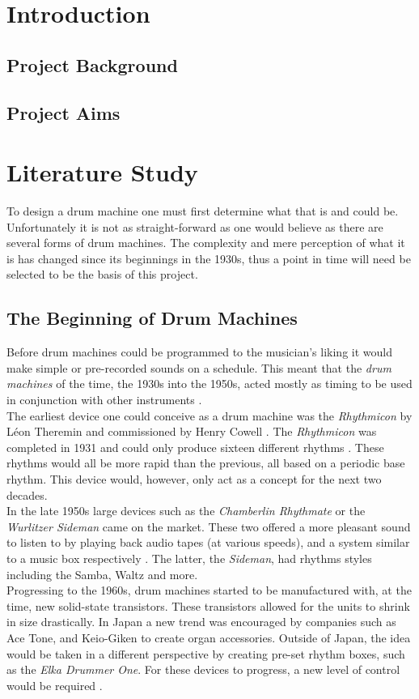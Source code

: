 \documentclass[12pt,a4paper]{report}
\begin{document}
\chapter{Introduction}
\section{Project Background}
\section{Project Aims}

\chapter{Literature Study}
To design a drum machine one must first determine what that is and could be. Unfortunately it is not as straight-forward as one would believe as there are several forms of drum machines. The complexity and mere perception of what it is has changed since its beginnings in the 1930s, thus a point in time will need be selected to be the basis of this project.
\section{The Beginning of Drum Machines}
Before drum machines could be programmed to the musician's liking it would make simple or pre-recorded sounds on a schedule. This meant that the \textit{drum machines} of the time, the 1930s into the 1950s, acted mostly as timing to be used in conjunction with other instruments \cite{rhythmart}. \\
The earliest device one could conceive as a drum machine was the \textit{Rhythmicon} by L\'eon Theremin and commissioned by Henry Cowell \cite{rhythmart, beatgoeson}. The \textit{Rhythmicon} was completed in 1931 and could only produce sixteen different rhythms \cite{schedel}. These rhythms would all be more rapid than the previous, all based on a periodic base rhythm. This device would, however, only act as a concept for the next two decades. \\
In the late 1950s large devices such as the \textit{Chamberlin Rhythmate} or the \textit{Wurlitzer Sideman} came on the market. These two offered a more pleasant sound to listen to by playing back audio tapes (at various speeds), and a system similar to a music box respectively \cite{rhythmart, beatgoeson}. The latter, the \textit{Sideman}, had rhythms styles including the Samba, Waltz and more\cite{WangOliver2014Htdm}. \\
Progressing to the 1960s, drum machines started to be manufactured with, at the time, new solid-state transistors. These transistors allowed for the units to shrink in size drastically. In Japan a new trend was encouraged by companies such as Ace Tone, and Keio-Giken to create organ accessories. Outside of Japan, the idea would be taken in a different perspective by creating pre-set rhythm boxes, such as the \textit{Elka Drummer One}. For these devices to progress, a new level of control would be required \cite{rhythmart}.
\end{document}

